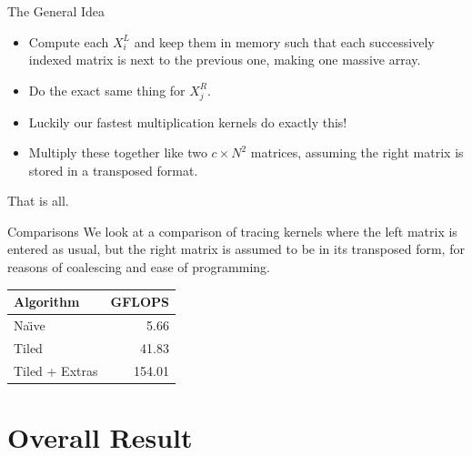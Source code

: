 \documentclass[xcolor=svgnames]{beamer}
\newenvironment{CUDAtiming}%
{\setlength{\extrarowheight}{1.5pt} \begin{center}\begin{tabular}{l|r} Algorithm & GFLOPS\\\hline}%
{\end{tabular}\end{center}}
\begin{document}
\begin{frame}{The General Idea}
 \begin{itemize}
  \item Compute each $X_i^L$ and keep them in memory such that each successively indexed matrix is next to the previous one, making one massive array.
  \item Do the exact same thing for $X_j^R$.
  \item Luckily our fastest multiplication kernels do exactly this!
  \item Multiply these together like two $c \times N^2$ matrices, assuming the right matrix is stored in a transposed format.
 \end{itemize}
 
 \vspace{1em}
 
 \begin{center}
  That is all.
 \end{center}
\end{frame}

\begin{frame}{Comparisons}
We look at a comparison of tracing kernels where the left matrix is entered as usual, but the right matrix is assumed to be in its transposed form, for reasons of coalescing and ease of programming.

 \begin{CUDAtiming}
  Na{\"\i}ve & 5.66\\
  \pause
  Tiled & 41.83\\
  \pause
  Tiled + Extras & 154.01
 \end{CUDAtiming}
\end{frame}



\section{Overall Result}
\end{document}
